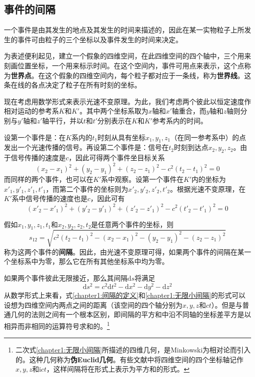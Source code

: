 \subsection{事件的间隔}

一个事件是由其发生的地点及其发生的时间来描述的，因此在某一实物粒子上所发生的事件可由粒子的三个坐标以及事件发生的时间来决定。

为表述便利起见，建立一个假象的四维空间，在此四维空间的四个轴中，三个用来刻画位置坐标，一个用来标示时间。在这个空间内，事件可用点来表示，这个点称为{\bf 世界点}。在这个假象的四维空间内，每个粒子都对应于一条线，称为{\bf 世界线}。这条在线的各点决定了粒子在所有时刻的坐标。

现在考虑用数学形式来表示光速不变原理。为此，我们考虑两个彼此以恒定速度作相对运动的参考系$K$和$K'$。其中两个坐标系取为$x$轴和$x'$轴重合，而$y$轴和$z$轴则分别与$y'$轴和$z'$轴平行，并以$t$和$t'$分别表示在$K$和$K'$参考系内的时间。

设第一个事件是：在$K$系内的$t_1$时刻从具有坐标$x_1,y_1,z_1$（在同一参考系中）的点发出一个光速传播的信号。再设第二个事件是：信号在$t_2$时刻到达点$x_2,y_2,z_2$。由于信号传播的速度是$c$，因此可得两个事件坐目标关系
\begin{equation}
	(x_2-x_1)^2+(y_2-y_1)^2+(z_2-z_1)^2-c^2(t_2-t_1)^2 = 0
	\label{chapter1:K系中两个事件坐目标关系}
\end{equation}
而同样的两个事件，也可以在$K'$系中观察。设第一个事件在$K'$内的坐标为$x'_1,y'_1,z'_1,t'_1$，而第二个事件的坐标则为$x'_2,y'_2,z'_2,t'_2$。根据光速不变原理，在$K'$系中信号传播的速度也是$c$，因此可有
\begin{equation}
	(x'_2-x'_1)^2+(y'_2-y'_1)^2+(z'_2-z'_1)^2-c^2(t'_2-t'_1)^2 = 0
	\label{chapter1:K'系中两个事件坐目标关系}
\end{equation}

假如$x_1,y_1,z_1,t_1$和$x_2,y_2,z_2,t_2$是任意两个事件的坐标，则
\begin{equation}
	s_{12} = \sqrt{c^2(t_2-t_1)^2 - (x_2-x_1)^2 - (y_2-y_1)^2 - (z_2-z_1)^2}
	\label{chapter1:间隔的定义}
\end{equation}
称为这两个事件的{\bf 间隔}。因此，由光速不变原理可得，如果两个事件的间隔在某一个坐标系中为零，那么它在所有其他坐标系中均为零。

如果两个事件彼此无限接近，那么其间隔$\mathrm{d}s$将满足
\begin{equation}
	\mathrm{d} s^2 = c^2 \mathrm{d} t^2 - \mathrm{d} x^2 - \mathrm{d} y^2 - \mathrm{d} z^2
	\label{chapter1:无限小间隔}
\end{equation}
从数学形式上来看，式\eqref{chapter1:间隔的定义}和\eqref{chapter1:无限小间隔}的形式可以设想为四维空间内两点之间的距离（该空间的四个轴分别为$x,y,z$和$ct$）。但是与普通几何的法则之间有一个根本区别，即间隔的平方和中沿不同轴的坐标差平方是以相异而非相同的运算符号求和的。\footnote{二次式\eqref{chapter1:无限小间隔}所描述的四维几何，是Minkowski为相对论而引入的。这种几何称为{\bf 伪Euclid几何}。有些文献中将四维空间的四个坐标轴记作$x,y,z$和$\mathrm{i}ct$，这样间隔将在形式上表示为平方和的形式。}

